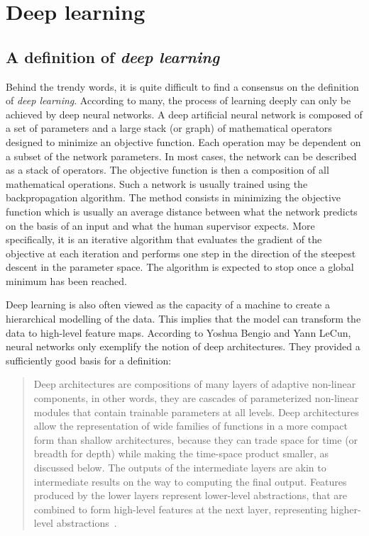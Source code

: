 \section{Deep learning}

    \subsection{A definition of \textit{deep learning}}

        Behind the trendy words, it is quite difficult to find a consensus on the definition of \textit{deep learning}.
        According to many, the process of learning
        deeply can only be achieved by deep neural networks. A deep artificial neural network is composed of a set of parameters and a large stack
        (or graph) of mathematical operators designed to minimize an objective function.
        Each operation may be dependent on a subset of the network parameters.
        In most cases, the network can be described as a stack of operators.
        The objective function is then a composition of all mathematical operations. Such a network is usually trained using the
        backpropagation algorithm. The method consists in minimizing the objective function which is usually an average distance between what the network
        predicts on the basis of an input and what the human supervisor expects. More specifically, it is an iterative algorithm that evaluates the gradient of the
        objective at each iteration and performs one step in the direction of the steepest descent in the parameter space. The algorithm is expected to stop
        once a global minimum has been reached.

        Deep learning is also often viewed as the capacity of a machine to create a hierarchical modelling of the data.
        This implies that the model can transform the data to high-level feature maps.
        According to Yoshua Bengio and Yann LeCun, neural networks only exemplify the notion of deep
        architectures. They provided a sufficiently good basis for a definition:

        \begin{quotation}
            Deep architectures are compositions of many layers of adaptive non-linear components,
            in other words, they are cascades of parameterized non-linear modules that contain
            trainable parameters at all levels. Deep architectures allow the representation of wide
            families of functions in a more compact form than shallow architectures, because they
            can trade space for time (or breadth for depth) while making the time-space product
            smaller, as discussed below. The outputs of the intermediate layers are akin to intermediate
            results on the way to computing the final output. Features produced by the lower
            layers represent lower-level abstractions, that are combined to form high-level features
            at the next layer, representing higher-level abstractions~\cite{40d5d7fd62cb44ba934a8a75d4b2b076}.
        \end{quotation}

